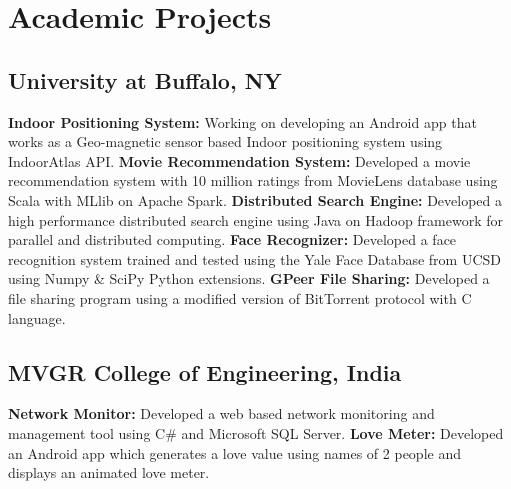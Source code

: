 \documentclass[11pt,a4paper,sans]{moderncv}
\begin{document}
\section{Academic Projects}
\subsection{University at Buffalo, NY}
{\textbf{Indoor Positioning System:} Working on developing an Android app that works as a Geo-magnetic sensor based Indoor positioning system using IndoorAtlas API. }
{\textbf{Movie Recommendation System:} Developed a movie recommendation system with 10 million ratings from MovieLens database using Scala with MLlib on Apache Spark.}
{\textbf{Distributed Search Engine:} Developed a high performance distributed search engine using Java on Hadoop framework for parallel and distributed computing.}{}
{\textbf{Face Recognizer:} Developed a face recognition system trained and tested using the Yale Face Database from UCSD using Numpy \& SciPy Python extensions.}{}
{\textbf{GPeer File Sharing:} Developed a file sharing program using a modified version of BitTorrent protocol with C language. }{}
\vspace*{-1mm}
\subsection{MVGR College of Engineering, India}
{\textbf{Network Monitor:} Developed a web based network monitoring and management tool using C\# and Microsoft SQL Server.}
{\textbf{Love Meter:} Developed an Android app which generates a love value using names of 2 people and displays an animated love meter.}
\end{document}
